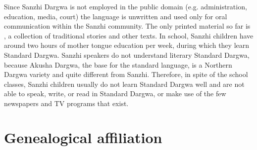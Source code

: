Since Sanzhi Dargwa is not employed in the public domain (e.g. administration, education, media,  court) the language is unwritten and used only for oral communication within the Sanzhi community. The only printed material so far is \citet{Forker.Gadzhimuradov2017}, a collection of traditional stories and other texts. In school, Sanzhi children have around two hours of mother tongue education per week, during which they learn Standard Dargwa. Sanzhi speakers do not understand literary Standard Dargwa, because Akusha Dargwa, the base for the standard language, is a Northern Dargwa variety and quite different from Sanzhi. Therefore, in spite of the school classes, Sanzhi children usually do not learn Standard Dargwa well and are not able to speak, write, or read in Standard Dargwa, or make use of the few newspapers and TV programs that exist.




\section{Genealogical affiliation}
\label{sec:Genealogical affiliation}

